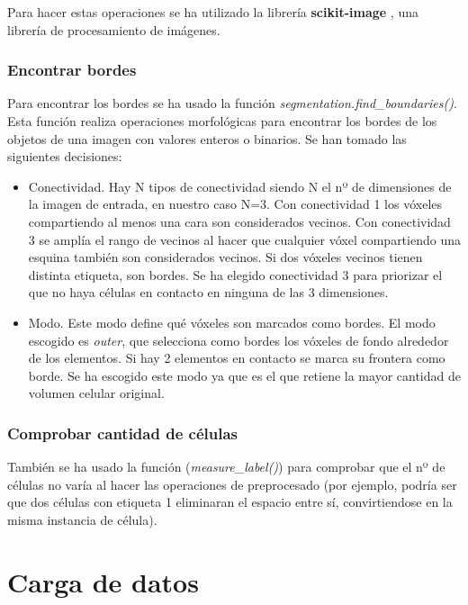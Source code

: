 Para hacer estas operaciones se ha utilizado la librería \textbf{scikit-image} \cite{Walt2014}, una librería de procesamiento de imágenes.

\subsubsection{Encontrar bordes}\label{subsubsec:multi_find_borders}

Para encontrar los bordes se ha usado la función \textit{segmentation.find\_boundaries()}. Esta función realiza operaciones morfológicas para encontrar los bordes de los objetos de una imagen con valores enteros o binarios. Se han tomado las siguientes decisiones:
\begin{itemize}
\item Conectividad. Hay N tipos de conectividad siendo N el nº de dimensiones de la imagen de entrada, en nuestro caso N=3. Con conectividad 1 los vóxeles compartiendo al menos una cara son considerados vecinos. Con conectividad 3 se amplía el rango de vecinos al hacer que cualquier vóxel compartiendo una esquina también son considerados vecinos. Si dos vóxeles vecinos tienen distinta etiqueta, son bordes. Se ha elegido conectividad 3 para priorizar el que no haya células en contacto en ninguna de las 3 dimensiones.
\item Modo. Este modo define qué vóxeles son marcados como bordes. El modo escogido es \textit{outer}, que selecciona como bordes los vóxeles de fondo alrededor de los elementos. Si hay 2 elementos en contacto se marca su frontera como borde. Se ha escogido este modo ya que es el que retiene la mayor cantidad de volumen celular original.
\end{itemize}

\subsubsection{Comprobar cantidad de células}\label{subsubsec:multi_count_cells}

También se ha usado la función (\textit{measure\_label()}) para comprobar que el nº de células no varía al hacer las operaciones de preprocesado (por ejemplo, podría ser que dos células con etiqueta 1 eliminaran el espacio entre sí, convirtiendose en la misma instancia de célula).

\section{Carga de datos}\label{sec:carga_datos}


